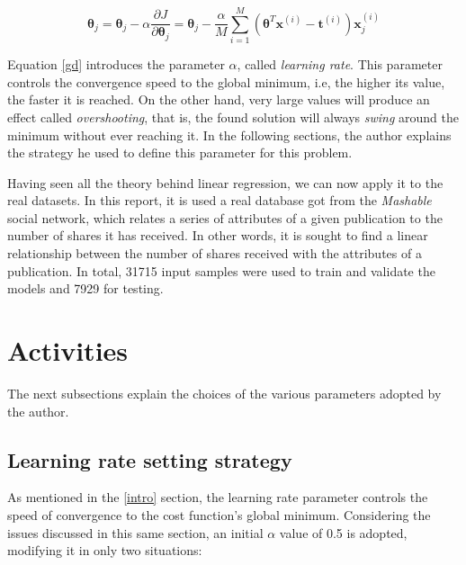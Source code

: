 \documentclass[10pt,twocolumn,letterpaper]{article}
\begin{document}
\begin{equation}
\label {gd}
\bm{\theta}_j = \bm{\theta}_j - \alpha\frac{\partial J}{\partial \bm{\theta}_j } = \bm{\theta}_j - \frac{\alpha}{M} \displaystyle\sum_{i=1}^{M} \left(\bm{\theta}^T\bm{x}^{(i)} - \bm{t}^{(i)}\right)\bm{x}_j^{(i)}
\end{equation}

Equation \ref {gd} introduces the parameter \(\alpha\), called \textit {learning rate}. This parameter controls the convergence speed to the global minimum, i.e, the higher its value, the faster it is reached. On the other hand, very large values will produce an effect called \textit {overshooting}, that is, the found solution will always \textit {swing} around the minimum without ever reaching it. In the following sections, the author explains the strategy he used to define this parameter for this problem.

Having seen all the theory behind linear regression, we can now apply it to the real datasets. In this report, it is used a real database \cite {database} got from the \textit{Mashable} social network, which relates a series of attributes of a given publication to the number of shares it has received. In other words, it is sought to find a linear relationship between the number of shares received with the attributes of a publication. In total, 31715 input samples were used to train and validate the models and 7929 for testing.

\section{Activities}

The next subsections explain the choices of the various parameters adopted by the author.

\subsection{Learning rate setting strategy}
\label{sec:ajuste}

As mentioned in the \ref{intro} section, the learning rate parameter controls the speed of convergence to the cost function's global minimum. Considering the issues discussed in this same section, an initial \(\alpha\) value of 0.5 is adopted, modifying it in only two situations:
\end{document}
